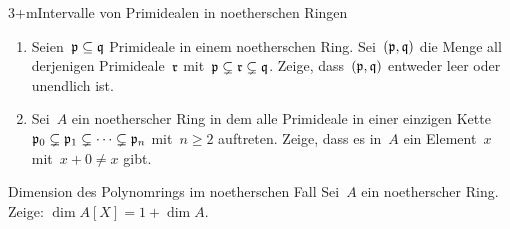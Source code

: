 \documentclass[entwurf]{uebblatt}
\begin{document}

\begin{aufgabe}{3+m}{Intervalle von Primidealen in noetherschen Ringen}
\begin{enumerate}
\item
Seien~$\mathfrak{p} \subseteq \mathfrak{q}$ Primideale in einem
noetherschen Ring. Sei~$(\mathfrak{p},\mathfrak{q})$ die Menge all derjenigen Primideale~$\mathfrak{r}$
mit~$\mathfrak{p} \subsetneq \mathfrak{r} \subsetneq \mathfrak{q}$. Zeige, dass~$(\mathfrak{p},\mathfrak{q})$ entweder
leer oder unendlich ist.
\item Sei~$A$ ein noetherscher Ring in dem alle Primideale in einer einzigen Kette~$\mathfrak{p}_0
\subsetneq \mathfrak{p}_1 \subsetneq \cdots \subsetneq \mathfrak{p}_n$ mit~$n \geq 2$ auftreten.
Zeige, dass es in~$A$ ein Element~$x$ mit~$x + 0 \neq x$ gibt.
\end{enumerate}
\end{aufgabe}

\begin{aufgabe}{}{Dimension des Polynomrings im noetherschen Fall}
Sei~$A$ ein noetherscher Ring. Zeige: $\dim A[X] = 1 + \dim A$.
\end{aufgabe}
\end{document}
